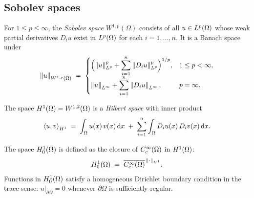 \subsection{Sobolev spaces}

\begin{definition}%
  \label{def:W1p}
  For $1 \le p \le \infty$, the \emph{Sobolev space} $W^{1,p}(\Omega)$ consists of
  all $u \in L^{p}(\Omega)$ whose weak partial derivatives $D_{i} u$ exist in
  $L^{p}(\Omega)$ for each $i = 1, \ldots, n$.  It is a Banach space under
  \begin{equation}\label{eq:W1p-norm}
    \left\lVert u \right\rVert_{W^{1,p}(\Omega)}
    \;=\;
    \begin{cases}
      \displaystyle
      \Bigl(\left\lVert u \right\rVert_{L^{p}}^{p}
        + \sum_{i=1}^{n} \left\lVert D_{i} u \right\rVert_{L^{p}}^{p}\Bigr)^{1/p},
      & 1 \le p < \infty, \\[8pt]
      \left\lVert u \right\rVert_{L^{\infty}} + \displaystyle\sum_{i=1}^{n} \left\lVert D_{i} u \right\rVert_{L^{\infty}},
      & p = \infty.
    \end{cases}
  \end{equation}
\end{definition}

\begin{definition}[$\Sob{1}(\Omega) = W^{1,2}(\Omega)$ (\Cref{sec:lean-ch1-sobolev})]%
  \label{def:H1}
  The space $\Sob{1}(\Omega) = W^{1,2}(\Omega)$ is a \emph{Hilbert space} with inner
  product
  \begin{equation}\label{eq:H1-inner-product}
    \left\langle u, v \right\rangle_{H^{1}}
    \;=\;
    \int_{\Omega} u(x)\,v(x)\,\mathrm{d} x
    \;+\;
    \sum_{i=1}^{n} \int_{\Omega} D_{i} u(x)\,D_{i} v(x)\,\mathrm{d} x.
  \end{equation}
\end{definition}

\begin{definition}%
  \label{def:H10}
  The space $H^{1}_0(\Omega)$ is defined as the closure of $C^\infty_c(\Omega)$ in
  $H^{1}(\Omega)$:
  \[
    H^{1}_0(\Omega)
    \;=\;
    \overline{C^\infty_c(\Omega)}^{\,\left\lVert \cdot \right\rVert_{H^{1}}}.
  \]
  Functions in $H^{1}_0(\Omega)$ satisfy a homogeneous Dirichlet boundary condition in
  the trace sense: $u\big|_{\partial\Omega} = 0$ whenever $\partial\Omega$ is
  sufficiently regular.
\end{definition}

